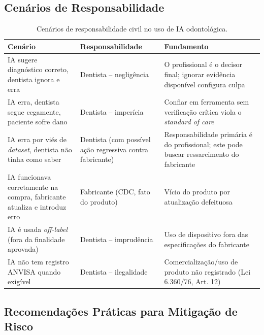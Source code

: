 \subsection{Cenários de Responsabilidade}

\begin{table}[H]
  \centering
  \caption{Cenários de responsabilidade civil no uso de IA odontológica.}
  \label{tab:cenarios-responsabilidade}
  \begin{tabularx}{\textwidth}{p{3cm}XX}
    \toprule
    \textbf{Cenário} & \textbf{Responsabilidade} & \textbf{Fundamento} \\
    \midrule
    IA sugere diagnóstico correto, dentista ignora e erra &
      Dentista -- negligência &
      O profissional é o decisor final; ignorar evidência disponível
      configura culpa \\
    IA erra, dentista segue cegamente, paciente sofre dano &
      Dentista -- imperícia &
      Confiar em ferramenta sem verificação crítica viola o
      \textit{standard of care} \\
    IA erra por viés de \textit{dataset}, dentista não tinha como saber &
      Dentista (com possível ação regressiva contra fabricante) &
      Responsabilidade primária é do profissional; este pode buscar
      ressarcimento do fabricante \\
    IA funcionava corretamente na compra, fabricante atualiza e introduz erro &
      Fabricante (CDC, fato do produto) &
      Vício do produto por atualização defeituosa \\
    IA é usada \textit{off-label} (fora da finalidade aprovada) &
      Dentista -- imprudência &
      Uso de dispositivo fora das especificações do fabricante \\
    IA não tem registro ANVISA quando exigível &
      Dentista -- ilegalidade &
      Comercialização/uso de produto não registrado (Lei 6.360/76, Art. 12) \\
    \bottomrule
  \end{tabularx}
\end{table}

\subsection{Recomendações Práticas para Mitigação de Risco}

